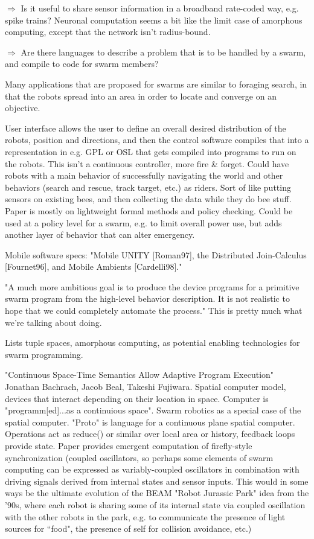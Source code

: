 \documentclass[]{article}
\begin{document}
$\Rightarrow$ Is it useful to share sensor information in a broadband rate-coded way, e.g. spike trains? Neuronal computation seems a bit like the limit case of amorphous computing, except that the network isn't radius-bound. 

$\Rightarrow$ Are there languages to describe a problem that is to be handled by a swarm, and compile to code for swarm members?

Many applications that are proposed for swarms are similar to foraging search, in that the robots spread into an area in order to locate and converge on an objective. 

User interface allows the user to define an overall desired distribution of the robots, position and directions, and then the control software compiles that into a representation in e.g. GPL or OSL that gets compiled into programs to run on the robots. This isn't a continuous controller, more fire \& forget. Could have robots with a main behavior of successfully navigating the world and other behaviors (search and rescue, track target, etc.) as riders. Sort of like putting sensors on existing bees, and then collecting the data while they do bee stuff. Paper is mostly on lightweight formal methods and policy checking. Could be used at a policy level for a swarm, e.g. to limit overall power use, but adds another layer of behavior that can alter emergency. 

Mobile software specs: "Mobile UNITY [Roman97], the Distributed Join-Calculus [Fournet96], and Mobile Ambients [Cardelli98]."

"A much more ambitious goal is to produce the device programs for a primitive swarm program from the high-level behavior description. It is not realistic to hope that we could completely automate the process." This is pretty much what we're talking about doing. 

Lists tuple spaces, amorphous computing, as potential enabling technologies for swarm programming. 

"Continuous Space-Time Semantics Allow Adaptive Program Execution" \cite{bachrach2007continuous} Jonathan Bachrach, Jacob Beal, Takeshi Fujiwara. Spatial computer model, devices that interact depending on their location in space. Computer is "programm[ed]...as a continuious space". Swarm robotics as a special case of the spatial computer. "Proto" is language for a continuous plane spatial computer. Operations act as reduce() or similar over local area or history, feedback loops provide state. Paper provides emergent computation of firefly-style synchronization (coupled oscillators, so perhaps some elements of swarm computing can be expressed as variably-coupled oscillators in combination with driving signals derived from internal states and sensor inputs. This would in some ways be the ultimate evolution of the BEAM "Robot Jurassic Park" idea from the '90s, where each robot is sharing some of its internal state via coupled oscillation with the other robots in the park, e.g. to communicate the presence of light sources for ``food", the presence of self for collision avoidance, etc.)
\end{document}
